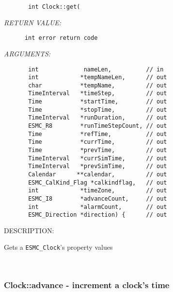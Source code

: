   
\begin{verbatim}       int Clock::get(\end{verbatim}{\em RETURN VALUE:}
\begin{verbatim}      int error return code\end{verbatim}{\em ARGUMENTS:}
\begin{verbatim}       int             nameLen,          // in
       int            *tempNameLen,      // out
       char           *tempName,         // out
       TimeInterval   *timeStep,         // out
       Time           *startTime,        // out
       Time           *stopTime,         // out
       TimeInterval   *runDuration,      // out
       ESMC_R8        *runTimeStepCount, // out
       Time           *refTime,          // out
       Time           *currTime,         // out
       Time           *prevTime,         // out
       TimeInterval   *currSimTime,      // out
       TimeInterval   *prevSimTime,      // out
       Calendar      **calendar,         // out
       ESMC_CalKind_Flag *calkindflag,   // out
       int            *timeZone,         // out
       ESMC_I8        *advanceCount,     // out
       int            *alarmCount,       // out
       ESMC_Direction *direction) {      // out
 \end{verbatim}
{\sf DESCRIPTION:\\ }


        Gets a {\tt ESMC\_Clock}'s property values
   
 
\mbox{}\hrulefill\ 
 
\subsubsection [Clock::advance] {Clock::advance - increment a clock's time}


